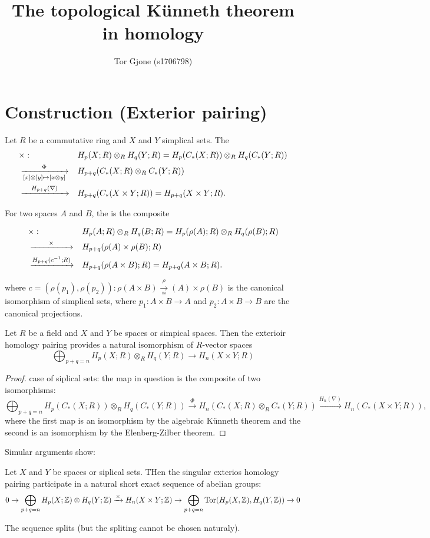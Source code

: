 \documentclass[a4paper,11pt,english]{article}
\title{\textbf{The topological Künneth theorem in homology}}
\author{Tor Gjone (s1706798)}
\begin{document}
\mmaketitle

\section{Construction (Exterior pairing)}
Let $R$ be a commutative ring and $X$ and $Y$ simplical sets. The 
\begin{align*}
& \times : && H_p(X; R) \otimes_R H_q(Y; R) = H_p(C_*(X; R)) \otimes_R H_q(C_*(Y; R)) \\ 
& \xrightarrow[{[x]\otimes[y] \mapsto [x\otimes y]}]{\Phi}  && H_{p+q}(C_*(X;R)\otimes_R C_*(Y;R))  \\
& \xrightarrow{\quad H_{p+q}(\nabla)\quad} && H_{p+q}(C_*(X\times Y; R)) = H_{p+q}(X\times Y;R).
\end{align*} 

For two spaces $A$ and $B$, the  is the composite

\begin{align*}
& \times : 
&& H_p(A; R) \otimes_R H_q(B; R) = H_{p} (\rho(A); R) \otimes_R H_q(\rho(B);R) \\ 
& \xrightarrow{\quad\quad\times\quad\quad}  
&&  H_{p+q}(\rho(A)\times\rho(B); R)  \\
& \xrightarrow{H_{p+q}(c^{-1};R)}
&& H_{p+q}(\rho(A\times B); R) = H_{p+q}(A\times B;R).
\end{align*} 

where $c = (\rho(p_1), \rho(p_2)): \rho(A \times B) \xrightarrow[\cong] \rho(A)\times \rho(B)$ is the canonical isomorphism of simplical sets, where $p_1 : A\times B \to A$ and $p_2 : A\times B \to B$ are the canonical projections.

\begin{them}
Let $R$ be a field and $X$ and $Y$ be spaces or simpical spaces. Then the exterioir homology pairing provides a natural isomorphism of $R$-vector spaces
\[ \bigoplus_{p+q=n} H_p(X;R)\otimes_R H_q(Y;R) \to H_n(X\times Y; R) \]
\end{them}

\begin{proof}
case of siplical sets: the map in question is the composite of two isomorphisms: 
\[ \bigoplus_{p+q=n} H_p(C_*(X; R)) \otimes_R H_q(C_*(Y; R)) \xrightarrow{\Phi} 
H_n(C_*(X;R)\otimes_R C_*(Y;R)) \xrightarrow{H_n(\nabla)}
H_n(C_*(X\times Y; R)), \]
where the first map is an isomorphism by the algebraic Künneth theorem and the second is an isomorphism by the Elenberg-Zilber theorem.
\end{proof}

Simular arguments show:

\begin{them}
Let $X$ and $Y$ be spaces or siplical sets. THen the singular exterios homology pairing participate in a natural short exact sequence of abelian groups: 
\[ 0 \to \bigoplus_{p+q=n} H_p(X;\mathbb{Z}) \otimes H_q(Y;\mathbb{Z}) \xrightarrow{\times} H_n(X\times Y; \mathbb{Z}) \to \bigoplus_{p+q=n} \operatorname{Tor}(H_p(X,\mathbb{Z}), H_q(Y,\mathbb{Z})) \to 0 \]

The sequence splits (but the spliting cannot be chosen naturaly).
\end{them}
\end{document}

